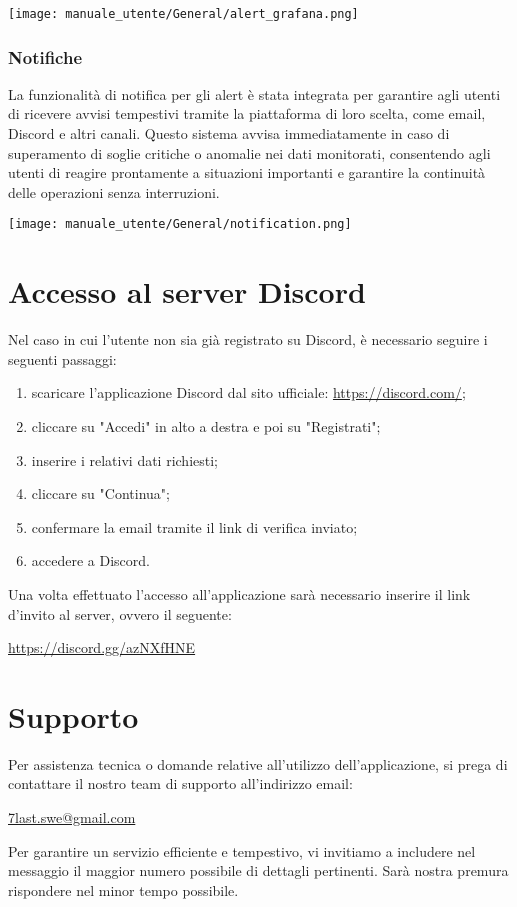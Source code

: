 \begin{center}
    \texttt{[image: manuale\_utente/General/alert\_grafana.png]}
\end{center} 

\subsubsection{Notifiche}
La funzionalità di notifica per gli alert è stata integrata per garantire agli utenti di ricevere avvisi tempestivi tramite la piattaforma di loro scelta, come email, Discord e altri canali. Questo sistema avvisa immediatamente in caso di superamento di soglie critiche o anomalie nei dati monitorati, consentendo agli utenti di reagire prontamente a situazioni importanti e garantire la continuità delle operazioni senza interruzioni.
\begin{center}
    \texttt{[image: manuale\_utente/General/notification.png]}
\end{center} 

\section{Accesso al server Discord}
Nel caso in cui l'utente non sia già registrato su Discord, è necessario seguire i seguenti passaggi:
\begin{enumerate}
    \item scaricare l'applicazione Discord dal sito ufficiale: \url{https://discord.com/};
    \item cliccare su "Accedi" in alto a destra e poi su "Registrati";
    \item inserire i relativi dati richiesti;
    \item cliccare su "Continua";
    \item confermare la email tramite il link di verifica inviato;
    \item accedere a Discord.
\end{enumerate}

\begin{flushleft}
Una volta effettuato l'accesso all'applicazione sarà necessario inserire il link d'invito al server, ovvero il seguente:
\begin{center}
    \url{https://discord.gg/azNXfHNE}
\end{center}
\end{flushleft}
    

\newpage
\section{Supporto}
Per assistenza tecnica o domande relative all’utilizzo dell’applicazione, si prega di contattare il nostro team di supporto all'indirizzo email: 
\begin{center}
    \href{mailto:7last.swe@gmail.com}{7last.swe@gmail.com}
\end{center} 
Per garantire un servizio efficiente e tempestivo, vi invitiamo a includere nel messaggio il maggior numero possibile di dettagli pertinenti. Sarà nostra premura rispondere nel minor tempo possibile.